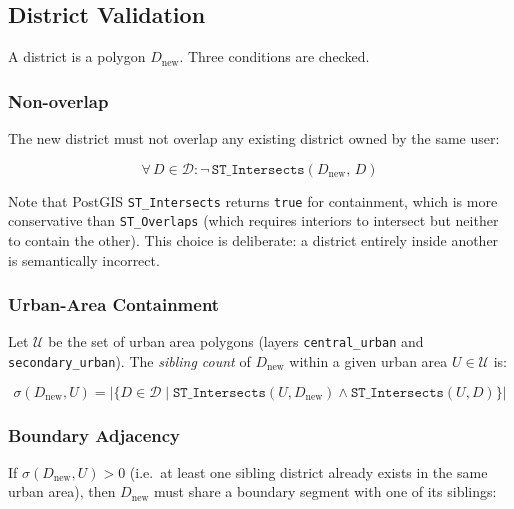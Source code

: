 \documentclass[12pt,a4paper]{article}
\theoremstyle{definition}
\theoremstyle{plain}
\theoremstyle{remark}
\newcommand{\abs}[1]{\left\lvert #1 \right\rvert}
\begin{document}
\subsection{District Validation}
\label{sec:district_validation}

A district is a polygon $D_{\text{new}}$. Three conditions are checked.

\subsubsection{Non-overlap}

The new district must not overlap any existing district owned by the same
user:

\begin{equation}
  \forall\, D \in \mathcal{D}:
  \neg\, \texttt{ST\_Intersects}(D_{\text{new}},\, D)
  \label{eq:district_no_overlap}
\end{equation}

Note that PostGIS \texttt{ST\_Intersects} returns \texttt{true} for
containment, which is more conservative than \texttt{ST\_Overlaps} (which
requires interiors to intersect but neither to contain the other). This
choice is deliberate: a district entirely inside another is semantically
incorrect.

\subsubsection{Urban-Area Containment}

Let $\mathcal{U}$ be the set of urban area polygons (layers
\texttt{central\_urban} and \texttt{secondary\_urban}). The \emph{sibling
count} of $D_{\text{new}}$ within a given urban area $U \in \mathcal{U}$ is:

\begin{equation}
  \sigma(D_{\text{new}}, U) = \abs{\{
    D \in \mathcal{D} \mid
    \texttt{ST\_Intersects}(U, D_{\text{new}}) \land
    \texttt{ST\_Intersects}(U, D)
  \}}
  \label{eq:sibling_count}
\end{equation}

\subsubsection{Boundary Adjacency}

If $\sigma(D_{\text{new}}, U) > 0$ (i.e.\ at least one sibling district
already exists in the same urban area), then $D_{\text{new}}$ must share a
boundary segment with one of its siblings:
\end{document}
